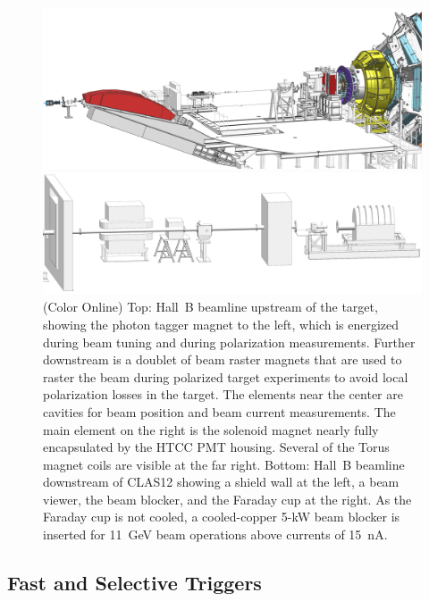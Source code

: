 \documentclass[final,3p,twocolumn]{elsarticle}
\begin{document}
\begin{figure}[t!]
\centerline{\includegraphics[width=2.0\columnwidth]{beamline-1.png}}
\centerline{\includegraphics[width=2.0\columnwidth]{beamline-3.png}}
\caption{(Color Online) Top: Hall~B beamline upstream of the target, showing the photon tagger magnet to the left, which is energized
during beam tuning and during polarization measurements. Further downstream is a doublet of beam raster magnets
that are used to raster the beam during polarized target experiments to avoid local polarization losses in the target.
The elements near the center are cavities for beam position and beam current measurements. The main element 
on the right is the solenoid magnet nearly fully encapsulated by the HTCC PMT housing. Several of the Torus magnet
coils are visible at the far right. 
Bottom: Hall~B beamline downstream of CLAS12 showing a shield wall at the left, a beam viewer, the beam blocker,
and the Faraday cup at the right. As the Faraday cup is not cooled, a cooled-copper 5-kW beam blocker is inserted
for 11~GeV beam operations above currents of 15~nA.}
\label{beamline}
\end{figure}

\subsection{Fast and Selective Triggers} 
\end{document}

